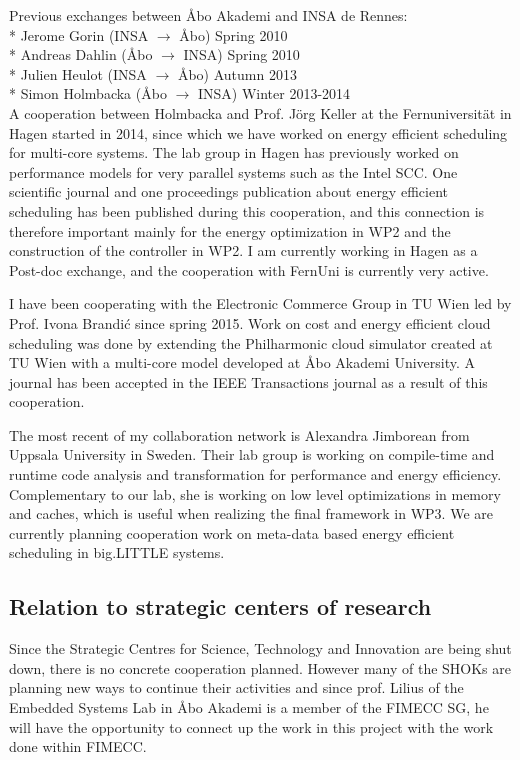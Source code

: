 \documentclass{article}
\begin{document}
Previous exchanges between \AA{}bo Akademi and INSA de Rennes:\\
* Jerome Gorin (INSA $\longrightarrow$ \AA{}bo) Spring 2010\\
* Andreas Dahlin (\AA{}bo $\longrightarrow$ INSA) Spring 2010\\
* Julien Heulot (INSA $\longrightarrow$ \AA{}bo) Autumn 2013\\
* Simon Holmbacka (\AA{}bo $\longrightarrow$ INSA) Winter 2013-2014\\

A cooperation between Holmbacka and Prof. J\"{o}rg Keller at the Fernuniversit\"{a}t in Hagen started in 2014, since which we have worked on energy efficient scheduling for multi-core systems. 
The lab group in Hagen has previously worked on performance models for very parallel systems such as the Intel SCC.
One scientific journal and one proceedings publication about energy efficient scheduling has been published during this cooperation,
and this connection is therefore important mainly for the energy optimization in WP2 and the construction of the controller in WP2.
I am currently working in Hagen as a Post-doc exchange, and the cooperation with FernUni is currently very active.

I have been cooperating with the Electronic Commerce Group in TU Wien led by Prof. 
Ivona Brandi\'{c} since spring 2015. 
Work on cost and energy efficient cloud scheduling was done by extending the Philharmonic cloud simulator created at TU Wien with a multi-core model developed at \AA{}bo Akademi University. 
A journal has been accepted in the IEEE Transactions journal as a result of this cooperation.

The most recent of my collaboration network is Alexandra Jimborean from Uppsala University in Sweden.
Their lab group is working on compile-time and runtime code analysis and transformation for performance and energy efficiency.
Complementary to our lab, she is working on low level optimizations in memory and caches, which is useful when realizing the final framework in WP3.
We are currently planning cooperation work on meta-data based energy efficient scheduling in big.LITTLE systems.

\subsection{Relation to strategic centers of research}
Since the Strategic Centres for Science, Technology and Innovation are being shut down, there is no concrete cooperation planned. 
However many of the SHOKs are planning new ways to continue their activities and since prof. Lilius of the Embedded Systems Lab in \AA{}bo Akademi is a member of the FIMECC SG, 
he will have the opportunity to connect up the work in this project with the work done within FIMECC.
\end{document}
